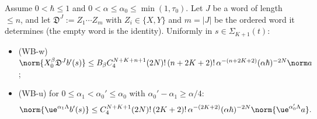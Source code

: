 \begin{lemma}[WB]\label{lem:wb}
Assume $0<\hbar\le1$ and $0<\alpha\le\alpha_0\le\min(1,\tau_0)$. Let $J$ be a word of length $\le n$, and let $\mathfrak D^J:=Z_1\cdots Z_m$ with $Z_i\in\{X,Y\}$ and $m=|J|$ be the ordered word it determines (the empty word is the identity). Uniformly in $s\in\Sigma_{K+1}(t)$:
\begin{itemize}
\item \textup{(WB-w)} $\norm{X_0^\beta\mathfrak D^Jb'(s)}\le B_\beta C_4^{N+K+n+1}(2N)!\,(n+2K+2)!\,\alpha^{-(n+2K+2)}(\alpha\hbar)^{-2N}\norm a$;
\item \textup{(WB-u)} for $0\le\alpha_1<\alpha_0'\le\alpha_0$ with $\alpha_0'-\alpha_1\ge\alpha/4$:
\[
\norm{\ue^{\alpha_1\Lambda}b'(s)}\le C_4^{N+K+1}(2N)!\,(2K+2)!\,\alpha^{-(2K+2)}(\alpha\hbar)^{-2N}\norm{\ue^{\alpha_0'\Lambda}a}.
\]
\end{itemize}
\end{lemma}

